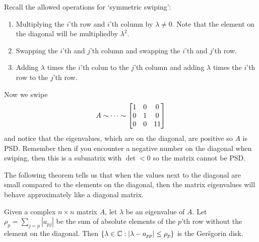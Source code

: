 \documentclass{exam}
\begin{document}
    \begin{answer}
        Recall the allowed operations for `symmetric swiping':
        \begin{enumerate}
            \item Multiplying the $i$'th row and $i$'th column by $\lambda \neq 0$.
            Note that the element on the diagonal will be multipliedby $\lambda^2$.
            \item Swapping the $i$'th and $j$'th column and swapping the $i$'th and $j$'th row.
            \item Adding $\lambda$ times the $i$'th colun to the $j$'th column and adding $\lambda$ times the $i$'th row to the $j$'th row.
        \end{enumerate}
        Now we swipe
        \[
            A \sim \dots \sim \matrix{1 & 0 & 0 \\ 0 & 1 & 0 \\ 0 & 0 & 11}
        \]
        and notice that the eigenvalues, which are on the diagonal, are positive so $A$ is PSD\@.
        Remember then if you encounter a negative number on the diagonal when swiping, then this is a submatrix with $\det <0$ so the matrix cannot be PSD\@.
    \end{answer}
    The following theorem tells us that when the values next to the diagonal are small compared to the elements on the diagonal, then the matrix eigenvalues will behave approximately like a diagonal matrix.
    \begin{theorem}
        Given a complex $n \times n$ matrix $A$, let $\lambda$ be an eigenvalue of $A$.
        Let $\rho_p = \sum_{j=p} |a_{pj}|$ be the sum of absolute elements of the $p$'th row without the element on the diagonal.
        Then $\{ \lambda \in \mathbb{C} : |\lambda - a_{pp}| \le \rho_p \}$ is the Ger\v{s}gorin disk.
    \end{theorem}
\end{document}
